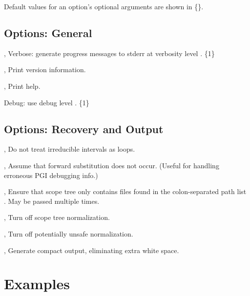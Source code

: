 \documentclass[english]{article}
\begin{document}
Default values for an option's optional arguments are shown in \{\}.

\subsection{Options: General}

\begin{Description}
\item[\OptoArg{-v}{n}, \OptoArg{--verbose}{n}] Verbose: generate progress messages to stderr at verbosity level .  \{1\}
\item[\Opt{-V}, \Opt{--version}] Print version information.
\item[\Opt{-h}, \Opt{--help}] Print help.
\item[\OptoArg{--debug}{n}]   Debug: use debug level . \{1\}
\end{Description}

\subsection{Options: Recovery and Output}

\begin{Description}
  \item[\Opt{-i}, \Opt{--irreducible-interval-as-loop-off}] Do not treat irreducible intervals as loops.
  \item[\Opt{-f}, \Opt{--forward-substitution-off}] Assume that forward substitution does not occur.  (Useful for handling erroneous PGI debugging info.)

  \item[\OptArg{-p}{path-list}, \OptArg{--canonical-paths}{path-list}] Ensure that scope tree only contains files found in the colon-separated path list . May be passed multiple times.

\item[\Opt{-n}, \Opt{--normalize-off}] Turn off scope tree normalization.
\item[\Opt{-u}, \Opt{--unsafe-normalize-off}] Turn off potentially unsafe normalization.

\item[\Opt{-c}, \Opt{--compact}] Generate compact output, eliminating extra white space.
\end{Description}

\section{Examples}
\end{document}
